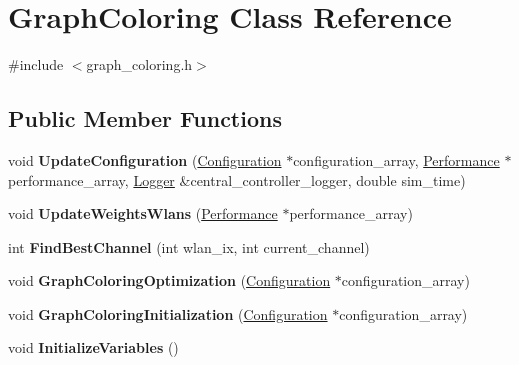 \hypertarget{classGraphColoring}{}\section{Graph\+Coloring Class Reference}
\label{classGraphColoring}


{\ttfamily \#include $<$graph\+\_\+coloring.\+h$>$}

\subsection*{Public Member Functions}
\begin{DoxyCompactItemize}
\item 
\mbox{\label{classGraphColoring_a8f0762e3222dac3389e315dbf6fac75e}} 
void {\bfseries Update\+Configuration} (\hyperlink{structConfiguration}{Configuration} $\ast$configuration\+\_\+array, \hyperlink{structPerformance}{Performance} $\ast$performance\+\_\+array, \hyperlink{structLogger}{Logger} \&central\+\_\+controller\+\_\+logger, double sim\+\_\+time)
\item 
\mbox{\label{classGraphColoring_a59aa0d25ab43d5e0a1333737e90a07d6}} 
void {\bfseries Update\+Weights\+Wlans} (\hyperlink{structPerformance}{Performance} $\ast$performance\+\_\+array)
\item 
\mbox{\label{classGraphColoring_ab15cb08c098dbc3edb271b38de730b9f}} 
int {\bfseries Find\+Best\+Channel} (int wlan\+\_\+ix, int current\+\_\+channel)
\item 
\mbox{\label{classGraphColoring_a45f12d87a4c2a4f7a1d0b5ca299aacfb}} 
void {\bfseries Graph\+Coloring\+Optimization} (\hyperlink{structConfiguration}{Configuration} $\ast$configuration\+\_\+array)
\item 
\mbox{\label{classGraphColoring_af254562a02df4b73c63aa7c1539cfbb2}} 
void {\bfseries Graph\+Coloring\+Initialization} (\hyperlink{structConfiguration}{Configuration} $\ast$configuration\+\_\+array)
\item 
\mbox{\label{classGraphColoring_ae67e3e5361b5d85a815bd4c4445392fb}} 
void {\bfseries Initialize\+Variables} ()
\item 

\end{DoxyCompactItemize}
